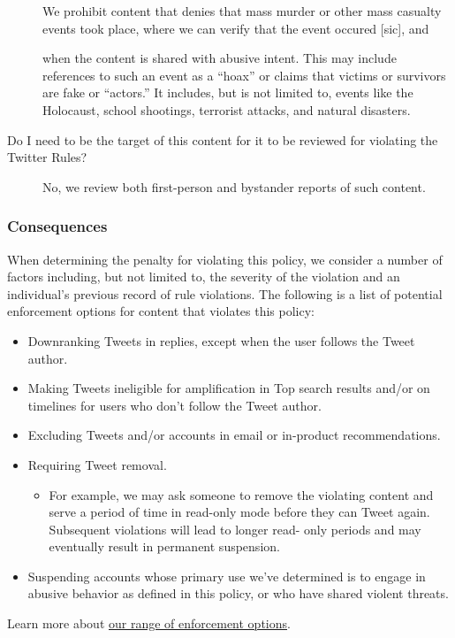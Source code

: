 \begin{description}
    We prohibit content that denies that mass murder or other mass casualty
    events took place, where we can verify that the event occured [sic], and

    when the content is shared with abusive intent. This may include references
    to such an event as a ``hoax'' or claims that victims or survivors are fake
    or ``actors.'' It includes, but is not limited to, events like the
    Holocaust, school shootings, terrorist attacks, and natural disasters.

\item[Do I need to be the target of this content for it to be reviewed for
    violating the Twitter Rules?] \hfill

    No, we review both first-person and bystander reports of such content.
\end{description}


\subsubsection{Consequences}

When determining the penalty for violating this policy, we consider a number of
factors including, but not limited to, the severity of the violation and an
individual's previous record of rule violations. The following is a list of
potential enforcement options for content that violates this policy:
\begin{itemize}
\item Downranking Tweets in replies, except when the user follows the Tweet
    author.
\item Making Tweets ineligible for amplification in Top search results and/or on
    timelines for users who don't follow the Tweet author.
\item Excluding Tweets and/or accounts in email or in-product recommendations.
\item Requiring Tweet removal.
    \begin{itemize}
    \item For example, we may ask someone to remove the violating content and
        serve a period of time in read-only mode before they can Tweet again.
        Subsequent violations will lead to longer read- only periods and may
        eventually result in permanent suspension.
    \end{itemize}
\item Suspending accounts whose primary use we've determined is to engage in
    abusive behavior as defined in this policy, or who have shared violent
    threats.
\end{itemize}
Learn more about
\href{https://web.archive.org/web/20220905021323/https://help.twitter.com/en/rules-and-policies/enforcement-options.html}{our
range of enforcement options}.

